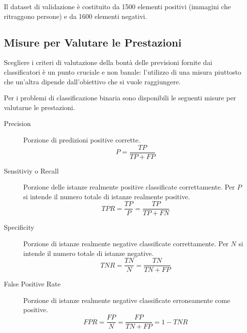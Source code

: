             Il dataset di validazione è costituito da 1500 elementi positivi (immagini che ritraggono persone) e da 1600 elementi negativi.

        \subsection{Misure per Valutare le Prestazioni} %
        \label{sub:misure_per_valutare_le_prestazioni}
            Scegliere i criteri di valutazione della bontà delle previsioni fornite dai classificatori è un punto cruciale e non banale: l'utilizzo di una misura piuttosto che un'altra dipende dall'obiettivo che si vuole raggiungere.

            Per i problemi di classificazione binaria sono disponibili le seguenti misure per valutarne le prestazioni.
            \begin{description}
                \item [Precision] Porzione di predizioni positive corrette.
                \begin{equation}
                    \label{eq:precision}
                    P = \frac{TP}{TP + FP}
                \end{equation}

                \item [Sensitiviy o Recall] Porzione delle istanze realmente positive classificate correttamente. Per $P$ si intende il numero totale di istanze realmente positive.
                \begin{equation}
                    \label{eq:tpr}
                    TPR = \frac{TP}{P} = \frac{TP}{TP + FN}
                \end{equation}

                \item [Specificity] Porzione di istanze realmente negative classificate correttamente. Per $N$ si intende il numero totale di istanze negative.
                \begin{equation}
                    \label{eq:tnr} 
                    TNR = \frac{TN}{N} = \frac{TN}{TN + FP}
                \end{equation}

                \item [False Positive Rate] Porzione di istanze realmente negative classificate erroneamente come positive.
                \begin{equation}
                    \label{eq:fpr}
                    FPR = \frac{FP}{N} = \frac{FP}{TN + FP} = 1 - TNR
                \end{equation}

                
            \end{description}
        
